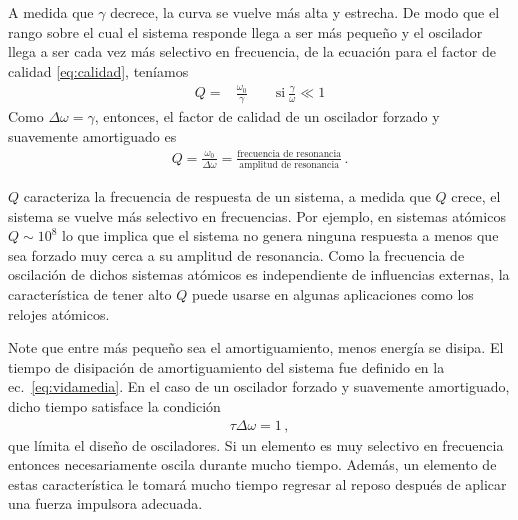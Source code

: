 A medida que $\gamma$ decrece, la curva se vuelve más alta y estrecha. De modo que el rango sobre el cual el sistema responde llega a ser más pequeño y el oscilador llega a ser cada vez más selectivo en frecuencia, de la ecuación para el factor de calidad \eqref{eq:calidad}, teníamos
\begin{align*}
Q=&\frac{\omega_0}{\gamma}\qquad\text{si}\ \frac{\gamma}{\omega}\ll 1  
\end{align*}
Como $\Delta\omega=\gamma$, entonces, el factor de calidad de  un oscilador forzado y suavemente amortiguado es
\begin{align*}
  Q=\frac{\omega_0}{\Delta \omega}=\frac{\text{frecuencia de resonancia}}{\text{amplitud de resonancia}}\,.
\end{align*}

$Q$ caracteriza la frecuencia de respuesta de un sistema, a medida que $Q$ crece, el sistema se vuelve más selectivo en frecuencias. Por ejemplo, en sistemas atómicos $Q\sim 10^8$ lo que implica que el sistema no genera ninguna respuesta a menos que sea forzado muy cerca a su amplitud de resonancia. Como la frecuencia de oscilación de dichos sistemas atómicos es independiente de influencias externas, la característica de tener alto $Q$ puede usarse en algunas aplicaciones como los relojes atómicos. 

Note que entre más pequeño sea el amortiguamiento, menos energía se disipa. El tiempo de disipación de amortiguamiento del sistema  fue definido en la ec.~\eqref{eq:vidamedia}. En el caso de un oscilador forzado y suavemente amortiguado, dicho tiempo satisface la condición
\begin{align*}
  \tau \Delta \omega =1\,,
\end{align*}
que límita el diseño de osciladores. Si un elemento es muy selectivo en frecuencia entonces necesariamente oscila durante mucho tiempo. Además,  un elemento de estas característica le tomará mucho tiempo regresar al reposo después de aplicar una fuerza impulsora adecuada. 

